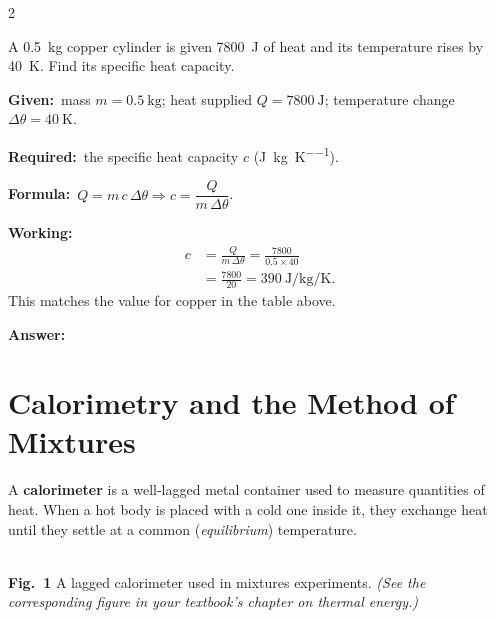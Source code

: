 \documentclass[10pt]{article}
\makeatletter
\let\theme@oldsection\section
\renewcommand{\section}{%
  \needspace{8\baselineskip}%
  \theme@oldsection}
\newcommand{\Given}{\par\vspace{2pt}\textbf{Given:}\ }
\newcommand{\Required}{\par\vspace{2pt}\textbf{Required:}\ }
\newcommand{\Formula}{\par\vspace{2pt}\textbf{Formula:}\ }
\newcommand{\Working}{\par\vspace{2pt}\textbf{Working:}}
\newcommand{\Answer}[1]{\par\vspace{2pt}\textbf{Answer:}\ \fbox{#1}}
\makeatother
\begin{document}
\begin{multicols}{2}
\begin{example}
A \SI{0.5}{\kilogram} copper cylinder is given \SI{7800}{\joule} of
heat and its temperature rises by \SI{40}{\kelvin}. Find its specific
heat capacity.
\tcblower
\Given mass $m = \SI{0.5}{\kilogram}$;
heat supplied $Q = \SI{7800}{\joule}$;
temperature change $\Delta\theta = \SI{40}{\kelvin}$.
\Required the specific heat capacity $c$
(\si{\joule\per\kilogram\per\kelvin}).
\Formula $Q = m\,c\,\Delta\theta \Rightarrow c = \dfrac{Q}{m\,\Delta\theta}$.
\Working
\begin{align*}
  c &= \frac{Q}{m\,\Delta\theta}
     = \frac{7800}{0.5 \times 40} \\
    &= \frac{7800}{20}
     = \SI{390}{\joule\per\kilogram\per\kelvin}.
\end{align*}
This matches the value for copper in the table above.
\Answer{$c = \SI{390}{\joule\per\kilogram\per\kelvin}$}
\end{example}

\section{Calorimetry and the Method of Mixtures}
A \textbf{calorimeter} is a well-lagged metal container used to measure
quantities of heat. When a hot body is placed with a cold one inside
it, they exchange heat until they settle at a common
(\emph{equilibrium}) temperature.

\begin{center}
\\[-2pt]
{\scriptsize\textbf{Fig.\ 1} A lagged calorimeter used in
mixtures experiments. \textit{(See the corresponding figure in your
textbook's chapter on thermal energy.)}}
\end{center}


\end{multicols}
\end{document}
